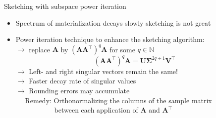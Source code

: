 \documentclass{beamer}
\newcommand{\bgk}[1]{\boldsymbol{#1}}
\newcommand{\bSigma}{\bgk{\Sigma}}
\newcommand{\bvec}[1]{\mathbf{#1}}
\newcommand{\vA}{\bvec{A}}
\newcommand{\vU}{\bvec{U}}
\newcommand{\vV}{\bvec{V}}
\newcommand{\bitem}{\item[$\bullet$]}
\begin{document}
\begin{frame}{Sketching with subspace power iteration}

\begin{itemize}
\bitem Spectrum of materialization decays slowly sketching is not great
\bitem Power iteration technique to enhance the sketching algorithm:\\
$\rightarrow$ replace $\vA$ by $(\vA\vA^\top)^q \vA$ for some $q\in\mathbb{N}$
$$
(\vA\vA^\top)^q \vA = \vU \bSigma^{2q+1}  \vV^\top
$$
$\rightarrow$ Left- and right singular vectors remain the same!\\
$\rightarrow$ Faster decay rate of singular values\\ 
$\rightarrow$ Rounding errors may accumulate\\
$\quad$ Remedy: Orthonormalizing the columns of the sample matrix \\
$\qquad\qquad\quad~$ between each application of $\vA$ and $\vA^{\top}$
\end{itemize}


\end{frame}
\end{document}
